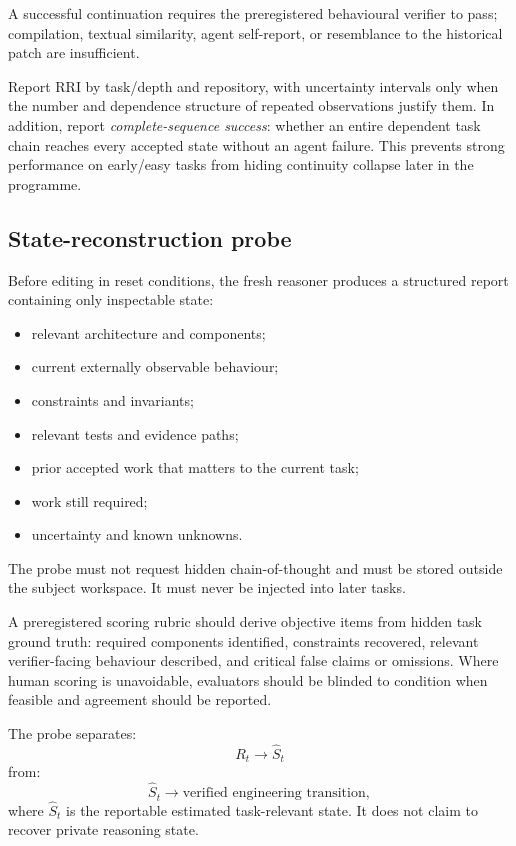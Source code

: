 A successful continuation requires the preregistered behavioural verifier to pass; compilation, textual similarity, agent self-report, or resemblance to the historical patch are insufficient.

Report RRI by task/depth and repository, with uncertainty intervals only when the number and dependence structure of repeated observations justify them. In addition, report \emph{complete-sequence success}: whether an entire dependent task chain reaches every accepted state without an agent failure. This prevents strong performance on early/easy tasks from hiding continuity collapse later in the programme.

\subsection{State-reconstruction probe}

Before editing in reset conditions, the fresh reasoner produces a structured report containing only inspectable state:
\begin{itemize}
    \item relevant architecture and components;
    \item current externally observable behaviour;
    \item constraints and invariants;
    \item relevant tests and evidence paths;
    \item prior accepted work that matters to the current task;
    \item work still required;
    \item uncertainty and known unknowns.
\end{itemize}

The probe must not request hidden chain-of-thought and must be stored outside the subject workspace. It must never be injected into later tasks.

A preregistered scoring rubric should derive objective items from hidden task ground truth: required components identified, constraints recovered, relevant verifier-facing behaviour described, and critical false claims or omissions. Where human scoring is unavoidable, evaluators should be blinded to condition when feasible and agreement should be reported.

The probe separates:
\begin{equation}
R_t \rightarrow \widehat{S}_t
\end{equation}
from:
\begin{equation}
\widehat{S}_t \rightarrow \text{verified engineering transition},
\end{equation}
where $\widehat{S}_t$ is the reportable estimated task-relevant state. It does not claim to recover private reasoning state.
